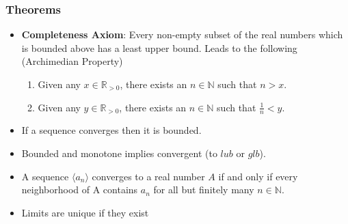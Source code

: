 \documentclass{article}
\begin{document}
\begin{multicols}{3}
  \subsubsection*{Theorems}
  \begin{itemize}
  \item \textbf{Completeness Axiom}: Every non-empty subset of the real numbers which is bounded above has a least upper bound. Leads to the following (Archimedian Property)
    \begin{enumerate}
    \item Given any $x \in \mathbb R_{> 0}$, there exists an $n \in \mathbb N$ such that $n > x$.
    \item Given any $y \in \mathbb R_{> 0}$, there exists an $n \in \mathbb N$ such that $\frac{1}{n} < y$.
    \end{enumerate}
  \item If a sequence converges then it is bounded.
  \item Bounded and monotone implies convergent (to $lub$ or $glb$).
  \item A sequence $\langle a_n\rangle $ converges to a real number $A$ if and only if every neighborhood of A contains $a_n$ for all but finitely many $n \in \mathbb N$.
  \item Limits are unique if they exist
  \end{itemize}


\end{multicols}
\end{document}
